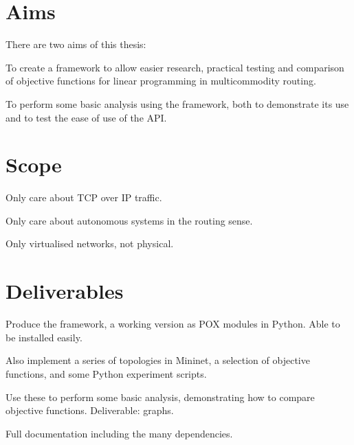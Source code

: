 \section{Aims}

There are two aims of this thesis:

To create a framework to allow easier research, practical testing and comparison of objective functions for linear programming in multicommodity routing.

To perform some basic analysis using the framework, both to demonstrate its use and to test the ease of use of the API.

\section{Scope}

Only care about TCP over IP traffic.

Only care about autonomous systems in the routing sense.

Only virtualised networks, not physical.

\section{Deliverables}

Produce the framework, a working version as POX modules in Python. Able to be installed easily.

Also implement a series of topologies in Mininet, a selection of objective functions, and some Python experiment scripts.

Use these to perform some basic analysis, demonstrating how to compare objective functions. Deliverable: graphs.

Full documentation including the many dependencies.
